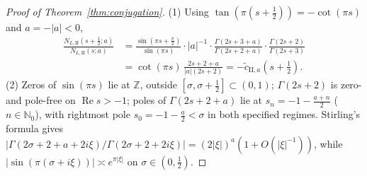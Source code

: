 \documentclass[11pt,a4paper]{article}
\begin{document}
\begin{proof}[Proof of Theorem~\ref{thm:conjugation}]
(1) Using $\tan(\pi(s+\frac{1}{2})) = -\cot(\pi s)$ and $a = -|a| < 0$,
\begin{align*}
\frac{N_{L,\mathrm{II}}(s+\frac{1}{2}; a)}{N_{L,\mathrm{II}}(s; a)}
&= \frac{\sin(\pi s + \frac{\pi}{2})}{\sin(\pi s)}\cdot |a|^{-1}\cdot \frac{\Gamma(2s + 3 + a)}{\Gamma(2s + 2 + a)}\cdot \frac{\Gamma(2s + 2)}{\Gamma(2s + 3)} \\
&= \cot(\pi s)\,\frac{2s + 2 + a}{|a|(2s + 2)} = -\tilde c_{\mathrm{II},a}\!\left(s + \tfrac{1}{2}\right).
\end{align*}
(2) Zeros of $\sin(\pi s)$ lie at $\mathbb{Z}$, outside $[\sigma,\sigma+\frac{1}{2}] \subset (0,1)$; $\Gamma(2s+2)$ is zero- and pole-free on $\operatorname{Re} s > -1$; poles of $\Gamma(2s+2+a)$ lie at $s_n = -1 - \frac{a+n}{2}$ ($n \in \mathbb{N}_0$), with rightmost pole $s_0 = -1 - \frac{a}{2} < \sigma$ in both specified regimes. Stirling's formula gives $|\Gamma(2\sigma+2+a+2i\xi)/\Gamma(2\sigma+2+2i\xi)| = (2|\xi|)^a(1 + O(|\xi|^{-1}))$, while $|\sin(\pi(\sigma+i\xi))| \asymp e^{\pi|\xi|}$ on $\sigma \in (0,\frac{1}{2})$.


\end{proof}
\end{document}
